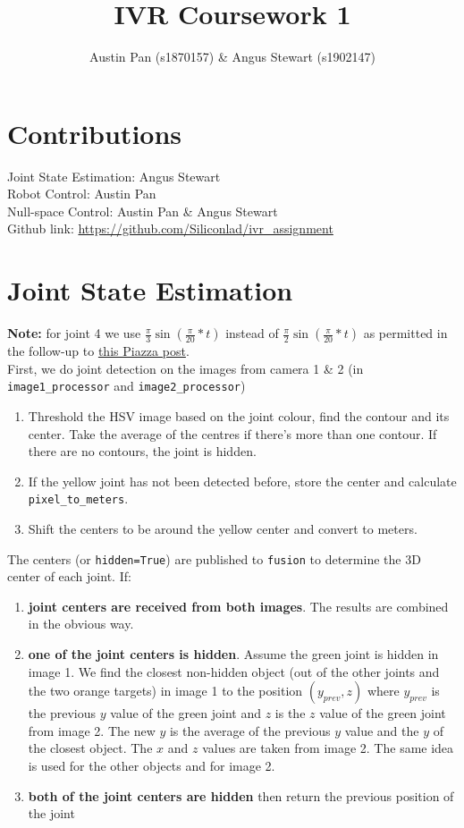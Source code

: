 \documentclass[11pt]{article}
\begin{document}
\title{IVR Coursework 1}
\author{Austin Pan (s1870157) \& Angus Stewart (s1902147)}
\date{\vspace{-5ex}}
\maketitle

\section{Contributions}
Joint State Estimation: Angus Stewart \\
Robot Control: Austin Pan \\
Null-space Control: Austin Pan \& Angus Stewart \\
Github link: \url{https://github.com/Siliconlad/ivr\_assignment}

\section{Joint State Estimation} \label{jse}
\textbf{Note:} for joint 4 we use $\frac{\pi}{3} \sin(\frac{\pi}{20} * t)$ instead of $\frac{\pi}{2} \sin(\frac{\pi}{20} * t)$ as permitted in the follow-up to \href{https://piazza.com/class/kee5t8gp4du6mm?cid=164}{this Piazza post}. \\

\noindent First, we do joint detection on the images from camera 1 \& 2 (in \texttt{image1\_processor} and \texttt{image2\_processor})
\begin{enumerate}
    \item Threshold the HSV image based on the joint colour, find the contour and its center. Take the average of the centres if there's more than one contour. If there are no contours, the joint is hidden.
    \item If the yellow joint has not been detected before, store the center and calculate \texttt{pixel\_to\_meters}.
    \item Shift the centers to be around the yellow center and convert to meters.
\end{enumerate}

\noindent The centers (or \texttt{hidden=True}) are published to \texttt{fusion} to determine the 3D center of each joint. If:
\begin{enumerate}
    \item \textbf{joint centers are received from both images}. The results are combined in the obvious way.
    \item \textbf{one of the joint centers is hidden}. Assume the green joint is hidden in image 1. We find the closest non-hidden object (out of the other joints and the two orange targets) in image 1 to the position $(y_{prev}, z)$ where $y_{prev}$ is the previous $y$ value of the green joint and $z$ is the $z$ value of the green joint from image 2. The new $y$ is the average of the previous $y$ value and the $y$ of the closest object. The $x$ and $z$ values are taken from image 2. The same idea is used for the other objects and for image 2.
    \item \textbf{both of the joint centers are hidden} then return the previous position of the joint
\end{enumerate}
\end{document}
